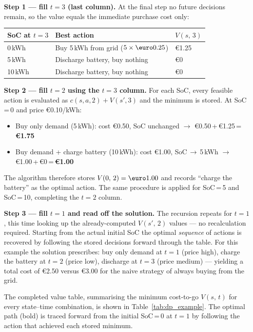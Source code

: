 \documentclass[11pt,a4paper]{report}
\begin{document}
\begin{itemize}
    \textbf{Step 1 --- fill $t=3$ (last column).}
    At the final step no future decisions remain, so the value equals the immediate purchase cost only:

    \begin{table}[H]
    \centering
    \begin{tabular}{lll}
    \toprule
    SoC at $t=3$ & Best action & $V(s,\,3)$ \\
    \midrule
    0\,kWh  & Buy 5\,kWh from grid ($5 \times \text{\euro}0.25$) & \euro1.25 \\
    5\,kWh  & Discharge battery, buy nothing               & \euro0    \\
    10\,kWh & Discharge battery, buy nothing               & \euro0    \\
    \bottomrule
    \end{tabular}
    \end{table}

    \textbf{Step 2 --- fill $t=2$ using the $t=3$ column.}
    For each SoC, every feasible action is evaluated as $c(s,a,2) + V(s',3)$ and the minimum is stored.
    At SoC\,=\,0 and price \euro0.10/kWh:
    \begin{itemize}
        \item Buy only demand (5\,kWh): cost \euro0.50, SoC unchanged $\to$ \euro0.50\,+\,\euro1.25\,=\,\textbf{\euro1.75}
        \item Buy demand + charge battery (10\,kWh): cost \euro1.00, SoC\,$\to$\,5\,kWh $\to$ \euro1.00\,+\,\euro0\,=\,\textbf{\euro1.00} \checkmark
    \end{itemize}
    The algorithm therefore stores $V(0,\,2)=\text{\euro}1.00$ and records ``charge the battery'' as the optimal action.
    The same procedure is applied for SoC\,=\,5 and SoC\,=\,10, completing the $t=2$ column.

    \textbf{Step 3 --- fill $t=1$ and read off the solution.}
    The recursion repeats for $t=1$, this time looking up the already-computed $V(s',\,2)$ values --- no recalculation required.
    Starting from the actual initial SoC the optimal \emph{sequence} of actions is recovered by following the stored decisions forward through the table.
    For this example the solution prescribes: buy only demand at $t=1$ (price high), charge the battery at $t=2$ (price low), discharge at $t=3$ (price medium) --- yielding a total cost of \euro2.50 versus \euro3.00 for the naive strategy of always buying from the grid.

    The completed value table, summarising the minimum cost-to-go $V(s,\,t)$ for every state--time combination, is shown in Table~\ref{tab:dp_example}.
    The optimal path (bold) is traced forward from the initial SoC\,=\,0 at $t=1$ by following the action that achieved each stored minimum.


\end{itemize}
\end{document}
